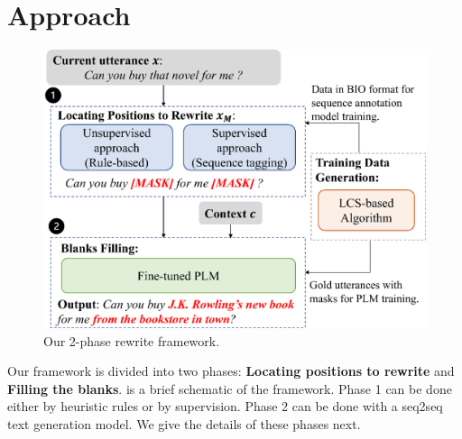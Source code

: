 \section{Approach}
\label{sec:2-step-supervised-method}

\begin{figure}[th]
        \centering
\includegraphics[width=\columnwidth]{fr1-crop.eps}
        \caption{Our 2-phase rewrite framework.}
        \label{fig:framework}
\end{figure}

Our framework is divided into two phases: \textbf{Locating positions to rewrite} and 
\textbf{Filling the blanks}. 
 is a brief schematic of the framework.
Phase 1 can be done either by heuristic rules or by supervision. 
Phase 2 can be done with a seq2seq text generation model. 
We give the details of these phases next.


